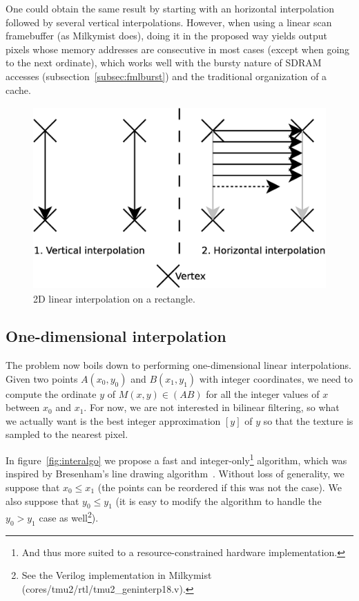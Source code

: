 \documentclass[a4paper,11pt]{kthesis}
\begin{document}
One could obtain the same result by starting with an horizontal interpolation followed by several vertical interpolations. However, when using a linear scan framebuffer (as Milkymist does), doing it in the proposed way yields output pixels whose memory addresses are consecutive in most cases (except when going to the next ordinate), which works well with the bursty nature of SDRAM accesses (subsection~\ref{subsec:fmlburst}) and the traditional organization of a cache.

\begin{figure}[htp]
\centering
\includegraphics[height=70mm]{rectinter.eps}
\caption{2D linear interpolation on a rectangle.}
\label{fig:rectinter}
\end{figure}

\subsection{One-dimensional interpolation}
The problem now boils down to performing one-dimensional linear interpolations. Given two points $A(x_{0}, y_{0})$ and $B(x_{1}, y_{1})$ with integer coordinates, we need to compute the ordinate $y$ of $M(x, y) \in (AB)$ for all the integer values of $x$ between $x_{0}$ and $x_{1}$. For now, we are not interested in bilinear filtering, so what we actually want is the best integer approximation $[y]$ of $y$ so that the texture is sampled to the nearest pixel.

In figure~\ref{fig:interalgo} we propose a fast and integer-only\footnote{And thus more suited to a resource-constrained hardware implementation.} algorithm, which was inspired by Bresenham's line drawing algorithm~\cite{bresenham}. Without loss of generality, we suppose that $x_{0} \leq x_{1}$ (the points can be reordered if this was not the case). We also suppose that $y_{0} \leq y_{1}$ (it is easy to modify the algorithm to handle the $y_{0} > y_{1}$ case as well\footnote{See the Verilog implementation in Milkymist (cores/tmu2/rtl/tmu2\_geninterp18.v).}).
\end{document}
